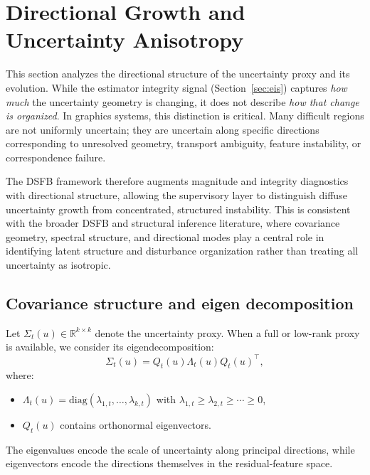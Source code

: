 \documentclass[11pt,letterpaper]{article}
\theoremstyle{gcresult}
\theoremstyle{definition}
\begin{document}
\section{Directional Growth and Uncertainty Anisotropy}
\label{sec:directional}

This section analyzes the directional structure of the uncertainty proxy and its evolution. While the estimator integrity signal (Section~\ref{sec:eis}) captures \emph{how much} the uncertainty geometry is changing, it does not describe \emph{how that change is organized}. In graphics systems, this distinction is critical. Many difficult regions are not uniformly uncertain; they are uncertain along specific directions corresponding to unresolved geometry, transport ambiguity, feature instability, or correspondence failure.

The DSFB framework therefore augments magnitude and integrity diagnostics with directional structure, allowing the supervisory layer to distinguish diffuse uncertainty growth from concentrated, structured instability. This is consistent with the broader DSFB and structural inference literature, where covariance geometry, spectral structure, and directional modes play a central role in identifying latent structure and disturbance organization rather than treating all uncertainty as isotropic. 


\subsection{Covariance structure and eigen decomposition}

Let $\Sigma_t(u)\in\mathbb{R}^{k\times k}$ denote the uncertainty proxy. When a full or low-rank proxy is available, we consider its eigendecomposition:
\begin{equation}
\Sigma_t(u)=Q_t(u)\Lambda_t(u)Q_t(u)^\top,
\end{equation}
where:
\begin{itemize}[leftmargin=1.5em]
    \item $\Lambda_t(u)=\mathrm{diag}(\lambda_{1,t},\dots,\lambda_{k,t})$ with $\lambda_{1,t}\ge \lambda_{2,t}\ge \cdots \ge 0$,
    \item $Q_t(u)$ contains orthonormal eigenvectors.
\end{itemize}

The eigenvalues encode the scale of uncertainty along principal directions, while eigenvectors encode the directions themselves in the residual-feature space.
\end{document}
